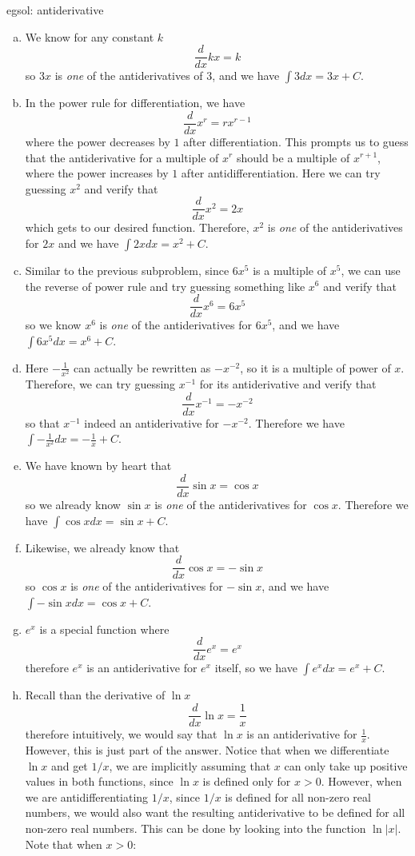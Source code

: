 \begin{egsol}[]{egsol: antiderivative}
    \begin{enumerate}[a)]
        \item We know for any constant $k$
        \[\frac{d}{dx}kx = k\]
        so $3x$ is \textit{one} of the antiderivatives of $3$, and we have $\int 3 dx = 3x + C$.
        \item In the power rule for differentiation, we have 
        \[\frac{d}{dx} x^r = r x^{r-1}\]
        where the power decreases by $1$ after differentiation.  This prompts us to guess that the antiderivative for a multiple of $x^r$ should be a multiple of $x^{r+1}$, where the power increases by $1$ after antidifferentiation.  Here we can try guessing $x^2$ and verify that
        \[\frac{d}{dx} x^2 = 2x\]
        which gets to our desired function.  Therefore, $x^2$ is \textit{one} of the antiderivatives for $2x$ and we have $\int 2x dx = x^2 + C$.
        \item Similar to the previous subproblem, since $6x^5$ is a multiple of $x^5$, we can use the reverse of power rule and try guessing something like $x^6$ and verify that
        \[\frac{d}{dx} x^6 = 6x^5\]
        so we know $x^6$ is \textit{one} of the antiderivatives for $6x^5$, and we have $\int 6x^5 dx = x^6 + C$.
        \item Here $-\frac{1}{x^2}$ can actually be rewritten as $-x^{-2}$, so it is a multiple of power of $x$.  Therefore, we can try guessing $x^{-1}$ for its antiderivative and verify that
        \[\frac{d}{dx}x^{-1} = -x^{-2}\]
        so that $x^{-1}$ indeed an antiderivative for $-x^{-2}$.  Therefore we have $\int -\frac{1}{x^2} dx = -\frac{1}{x} + C$.
        \item We have known by heart that
        \[\frac{d}{dx}\sin x = \cos x\]
        so we already know $\sin x$ is \textit{one} of the antiderivatives for $\cos x$.  Therefore we have $\int \cos x dx = \sin x + C$.
        \item Likewise, we already know that 
        \[\frac{d}{dx}\cos x = -\sin x\]
        so $\cos x$ is \textit{one} of the antiderivatives for $-\sin x$, and we have $\int -\sin x dx = \cos x + C$.
        \item $e^x$ is a special function where 
        \[\frac{d}{dx} e^x = e^x\]
        therefore $e^x$ is an antiderivative for $e^x$ itself, so we have $\int e^x dx = e^x + C$.
        \item Recall than the derivative of $\ln x$
        \[\frac{d}{dx} \ln x = \frac{1}{x}\]
        therefore intuitively, we would say that $\ln x$ is an antiderivative for $\frac{1}{x}$.  However, this is just part of the answer.  Notice that when we differentiate $\ln x$ and get $1/x$, we are implicitly assuming that $x$ can only take up positive values in both functions, since $\ln x$ is defined only for $x > 0$.  However, when we are antidifferentiating $1/x$, since $1/x$ is defined for all non-zero real numbers, we would also want the resulting antiderivative to be defined for all non-zero real numbers.  This can be done by looking into the function $\ln |x|$.  Note that when $x > 0$:

\end{enumerate}
\end{egsol}

